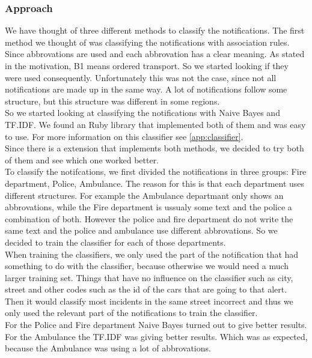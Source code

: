 \subsubsection*{Approach}
We have thought of three different methods to classify the notifications.
The first method we thought of was classifying the notifications with association rules.
Since abbrovations are used and each abbrovation has a clear meaning. 
As stated in the motivation, B1 means ordered transport. 
So we started looking if they were used consequently. 
Unfortunately this was not the case, since not all notifications are made up in the same way. 
A lot of notifications follow some structure, but this structure was different in some regions. \\
So we  started looking at classifying the notifications with Naive Bayes and TF.IDF. 
We found an Ruby library that implemented both of them and was easy to use. 
For more information on this classifier see \autoref{app:classifier}. \\
Since there is a extension that implements both methods, we decided to try both of them and see which one worked better.\\
To classify the notifcations, we first divided the notifications in three groups: Fire department, Police, Ambulance.
The reason for this is that each department uses different structures. For example the Ambulance departmant only shows an abbrovations, while the Fire department is ussualy some text and the police a combination of both. 
However the police and fire department do not write the same text and the police and ambulance use different abbrovations. So we decided to train the classifier for each of those departments. \\
When training the classifiers, we only used the part of the notification that had something to do with the classifier, because otherwise we would need a much larger training set. 
Things that have no influence on the classifier such as city, street and other codes such as the id of the cars that are going to that alert. Then it would classify most incidents in the same street incorrect and thus we only used the relevant part of the notifications to train the classifier. \\
For the Police and Fire department Naive Bayes turned out to give better results. For the Ambulance the TF.IDF was giving better results. Which was as  expected, because the Ambulance was using a lot of abbrovations. 

